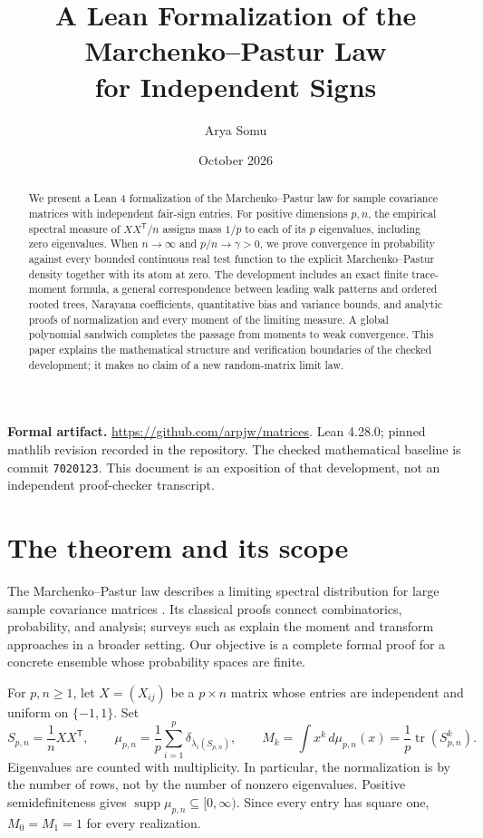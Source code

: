 \documentclass[11pt]{article}
\title{\textbf{A Lean Formalization of the\protect\\ Marchenko--Pastur Law\protect\\ for Independent Signs}}
\author{Arya Somu}
\date{October 2026}
\theoremstyle{remark}
\newcommand{\tr}{\operatorname{tr}}
\newcommand{\supp}{\operatorname{supp}}
\newcommand{\repo}{\url{https://github.com/arpjw/matrices}}
\begin{document}
\maketitle
\begin{abstract}
We present a Lean 4 formalization of the Marchenko--Pastur law for sample covariance matrices with independent fair-sign entries. For positive dimensions $p,n$, the empirical spectral measure of $XX^{\mathsf T}/n$ assigns mass $1/p$ to each of its $p$ eigenvalues, including zero eigenvalues. When $n\to\infty$ and $p/n\to\gamma>0$, we prove convergence in probability against every bounded continuous real test function to the explicit Marchenko--Pastur density together with its atom at zero. The development includes an exact finite trace-moment formula, a general correspondence between leading walk patterns and ordered rooted trees, Narayana coefficients, quantitative bias and variance bounds, and analytic proofs of normalization and every moment of the limiting measure. A global polynomial sandwich completes the passage from moments to weak convergence. This paper explains the mathematical structure and verification boundaries of the checked development; it makes no claim of a new random-matrix limit law.
\end{abstract}
\vspace{0.3em}
\noindent\textbf{Formal artifact.} \repo. Lean 4.28.0; pinned mathlib revision recorded in the repository. The checked mathematical baseline is commit \texttt{7020123}. This document is an exposition of that development, not an independent proof-checker transcript.

\section{The theorem and its scope}
The Marchenko--Pastur law describes a limiting spectral distribution for large sample covariance matrices \cite{mp}. Its classical proofs connect combinatorics, probability, and analysis; surveys such as \cite{fk} explain the moment and transform approaches in a broader setting. Our objective is a complete formal proof for a concrete ensemble whose probability spaces are finite.

For $p,n\geq1$, let $X=(X_{ij})$ be a $p\times n$ matrix whose entries are independent and uniform on $\{-1,1\}$. Set
\[
 S_{p,n}=\frac1nXX^{\mathsf T},\qquad
 \mu_{p,n}=\frac1p\sum_{i=1}^{p}\delta_{\lambda_i(S_{p,n})},\qquad
 M_k=\int x^k\,d\mu_{p,n}(x)=\frac1p\tr(S_{p,n}^k).
\]
Eigenvalues are counted with multiplicity. In particular, the normalization is by the number of rows, not by the number of nonzero eigenvalues. Positive semidefiniteness gives $\supp\mu_{p,n}\subseteq[0,\infty)$. Since every entry has square one, $M_0=M_1=1$ for every realization.
\end{document}
